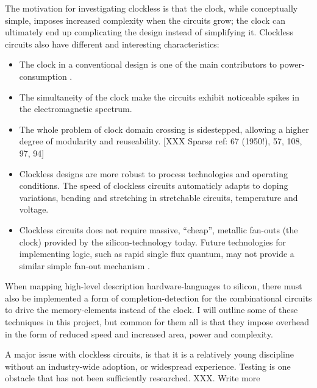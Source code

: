The motivation for investigating clockless is that the clock, while
conceptually simple, imposes increased complexity when the circuits
grow; the clock can ultimately end up complicating the design instead
of simplifying it. Clockless circuits also have different and
interesting characteristics: \begin{itemize}

\item The clock in a conventional design is one of the main
  contributors to power-consumption \cite{tiwari1998reducing}.

\item The simultaneity of the clock make the circuits exhibit
  noticeable spikes in the electromagnetic spectrum.

\item The whole problem of clock domain crossing is sidestepped,
  allowing a higher degree of modularity and reuseability. [XXX Sparsø
    ref: 67 (1950!), 57, 108, 97, 94]

\item Clockless designs are more robust to process technologies and
  operating conditions. The speed of clockless circuits automaticly
  adapts to doping variations, bending and stretching in stretchable
  circuits, temperature and voltage.

\item Clockless circuits does not require massive, ``cheap'', metallic
  fan-outs (the clock) provided by the silicon-technology today. Future
  technologies for implementing logic, such as rapid single flux
  quantum, may not provide a similar simple fan-out mechanism \cite{rapid}.
\end{itemize}

When mapping high-level description hardware-languages to silicon,
there must also be implemented a form of completion-detection for the
combinational circuits to drive the memory-elements instead of the
clock. I will outline some of these techniques in this project, but
common for them all is that they impose overhead in the form of
reduced speed and increased area, power and complexity.

A major issue with clockless circuits, is that it is a relatively
young discipline without an industry-wide adoption, or widespread
experience. Testing is one obstacle that has not been sufficiently
researched. XXX. Write more
